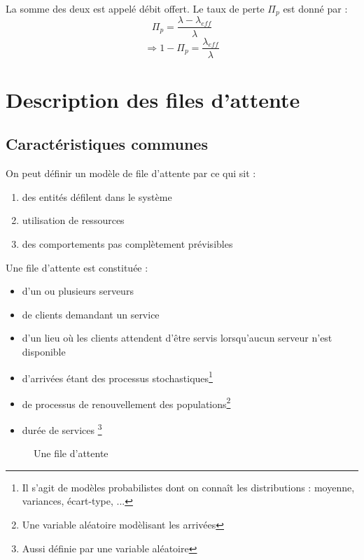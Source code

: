 \documentclass[a4paper, 11pt, fleqn]{article}
\newcommand{\fa}[0]{file d'attente }
\newcommand{\VA}[0]{variable aléatoire }
\begin{document}
La somme des deux est appelé débit offert. Le taux de perte $\Pi_p$ est donné par : $$
\Pi_p = \frac{\lambda - \lambda_{eff}}{\lambda}$$ $$
\Longrightarrow 1 - \Pi_p = \frac {\lambda_{eff}}{\lambda} $$

\section{Description des files d'attente}

\subsection{Caractéristiques communes}

On peut définir un modèle de \fa par ce qui sit :
\begin{enumerate}
	\item des entités défilent dans le système
	\item utilisation de ressources
	\item des comportements pas complètement prévisibles
\end{enumerate}

Une \fa est constituée :
\begin{itemize}
	\item d'un ou plusieurs serveurs
	\item de clients demandant un service
	\item d'un lieu où les clients attendent d'être servis lorsqu'aucun serveur n'est disponible
	\item d'arrivées étant des processus stochastiques\footnote{Il s'agit de modèles probabilistes dont on
		connaît les distributions : moyenne, variances, écart-type, ...}
	\item de processus de renouvellement des populations\footnote{Une \VA modèlisant les arrivées}
	\item durée de services \footnote{Aussi définie par une \VA}
\end{itemize}

\begin{figure}
	\begin{center}
	\end{center}
	\caption{Une file d'attente}
\end{figure}
\end{document}
